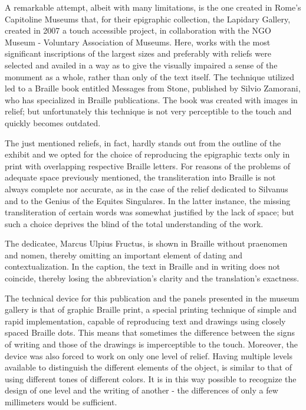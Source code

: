\documentclass[amsthm,ebook]{saparticle}
\begin{document}
A remarkable attempt, albeit with many limitations, is the one created in Rome’s Capitoline Museums that, for their
epigraphic collection, the Lapidary Gallery, created in 2007 a touch accessible project, in collaboration with the NGO
Museum - Voluntary Association of Museums. Here, works with the most significant inscriptions of the largest sizes and
preferably with reliefs were selected and availed in a way as to give the visually impaired a sense of the monument as
a whole, rather than only of the text itself. The technique utilized led to a Braille book entitled Messages from
Stone, published by Silvio Zamorani, who has specialized in Braille publications. The book was created with images in
relief; but unfortunately this technique is not very perceptible to the touch and quickly becomes outdated.

The just mentioned reliefs, in fact, hardly stands out from the outline of the exhibit and we opted for the choice of
reproducing the epigraphic texts only in print with overlapping respective Braille letters. For reasons of the problems
of adequate space previously mentioned, the transliteration into Braille is not always complete nor accurate, as in the
case of the relief dedicated to Silvanus and to the Genius of the Equites Singulares. In the latter instance, the
missing transliteration of certain words was somewhat justified by the lack of space; but such a choice deprives the
blind of the total understanding of the work. 

The dedicatee, Marcus Ulpius Fructus, is shown in Braille without
praenomen and nomen, thereby omitting an important element of dating and contextualization. In the caption, the text in
Braille and in writing does not coincide, thereby losing the abbreviation’s clarity and the translation’s exactness.

The technical device for this publication and the panels presented in the museum gallery is that of graphic Braille
print, a special printing technique of simple and rapid implementation, capable of reproducing text and drawings using
closely spaced Braille dots. This means that sometimes the difference between the signs of writing and those of the
drawings is imperceptible to the touch. Moreover, the device was also forced to work on only one level of relief.
Having multiple levels available to distinguish the different elements of the object, is similar to that of using
different tones of different colors. It is in this way possible to recognize the design of one level and the writing of
another - the differences of only a few millimeters would be sufficient.
\end{document}
